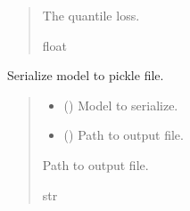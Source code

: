 \documentclass[letterpaper,10pt,english]{sphinxmanual}
\begin{document}
\begin{fulllineitems}
\begin{quote}
\begin{description}
\begin{itemize}
\end{itemize}

\sphinxAtStartPar
The quantile loss.

\sphinxAtStartPar
float

\end{description}\end{quote}

\end{fulllineitems}


\begin{fulllineitems}
\label{\detokenize{src_demand_forecast.models:src_demand_forecast.models.repro_experiments.serialize_model}}
\pysigstartsignatures
{}
\pysigstopsignatures
\sphinxAtStartPar
Serialize model to pickle file.
\begin{quote}\begin{description}
\begin{itemize}
\item {} 
\sphinxAtStartPar
{} () \textendash{} Model to serialize.

\item {} 
\sphinxAtStartPar
{} () \textendash{} Path to output file.

\end{itemize}

\sphinxAtStartPar
Path to output file.

\sphinxAtStartPar
str

\end{description}\end{quote}

\end{fulllineitems}
\end{document}
